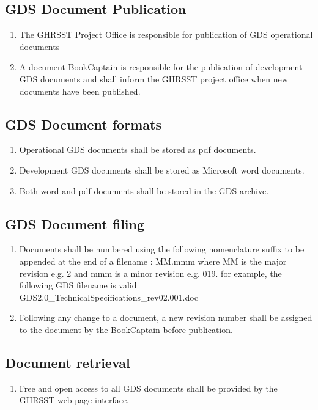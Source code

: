 \subsection{GDS Document Publication}
\begin{enumerate}[noitemsep]
    \item The GHRSST Project Office is responsible for publication of GDS operational documents
    \item A document BookCaptain is responsible for the publication of development GDS documents and shall inform the GHRSST project office when new documents have been published.
\end{enumerate}

\subsection{GDS Document formats}
\begin{enumerate}[noitemsep]
    \item Operational GDS documents shall be stored as pdf documents.
    \item Development GDS documents shall be stored as Microsoft word documents.
    \item Both word and pdf documents shall be stored in the GDS archive.
\end{enumerate}

\subsection{GDS Document filing}
\begin{enumerate}[noitemsep]
\item Documents shall be numbered using the following nomenclature suffix to be appended at the end of a filename : \newp
MM.mmm \newp
where MM is the major revision e.g. 2 and mmm is a minor revision e.g. 019. for example, the
following GDS filename is valid \newp
GDS2.0\_TechnicalSpecifications\_rev02.001.doc \newp 
\item Following any change to a document, a new revision number shall be assigned to the document by the BookCaptain before publication.
\end{enumerate}

\subsection{Document retrieval}
\begin{enumerate}[noitemsep]
\item Free and open access to all GDS documents shall be provided by the GHRSST web page interface.
\end{enumerate}

